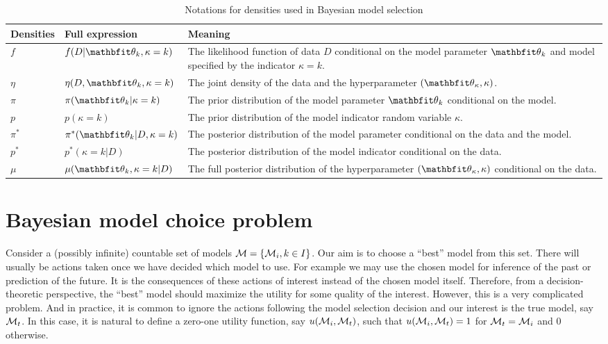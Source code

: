 \begin{table}[ht]
  \caption{Notations for densities used in Bayesian model selection}
  \label{tab:notations}
  \begin{tabularx}{\textwidth}{llX}
    \toprule
    Densities & Full expression & Meaning \\
    \midrule
    $f$ & $f(D|\bth_k,\kappa=k)$
    & The likelihood function of data $D$ conditional on the model parameter
    $\bth_k$ and model specified by the
    indicator $\kappa = k$. \\
    $\eta$ & $\eta(D,\bth_k,\kappa=k)$
    & The joint density of the data and the hyperparameter
    $(\bth_{\kappa},\kappa)$. \\
    $\pi$ & $\pi(\bth_k|\kappa=k)$
    & The prior distribution of the model parameter $\bth_k$ conditional on
    the model. \\
    $p$ & $p(\kappa = k)$
    & The prior distribution of the model indicator random variable
    $\kappa$. \\
    $\pi^*$ & $\pi^*(\bth_k|D,\kappa=k)$
    & The posterior distribution of the model parameter conditional on the
    data and the model. \\
    $p^*$ & $p^*(\kappa=k|D)$
    & The posterior distribution of the model indicator conditional on the
    data. \\
    $\mu$ & $\mu(\bth_k,\kappa=k|D)$
    & The full posterior distribution of the hyperparameter
    $(\bth_{\kappa},\kappa)$ conditional on the data. \\
    \bottomrule
  \end{tabularx}
\end{table}

\section{Bayesian model choice problem}
\label{sec:Bayesian model choice problem}

Consider a (possibly infinite) countable set of models $\mathcal{M} = \{\mathcal{M}_i,
  k\in I\}$. Our aim is to choose a ``best'' model from this set. There will
usually be actions taken once we have decided which model to use. For example
we may use the chosen model for inference of the past or prediction of the
future. It is the consequences of these actions of interest instead of the
chosen model itself. Therefore, from a decision-theoretic perspective, the
``best'' model should maximize the utility for some quality of the interest.
However, this is a very complicated problem. And in practice, it is common to
ignore the actions following the model selection decision and our interest is
the true model, say $\mathcal{M}_t$. In this case, it is natural to define a
zero-one utility function, say $u(\mathcal{M}_i,\mathcal{M}_t)$, such that
$u(\mathcal{M}_i,\mathcal{M}_t) = 1$ for $\mathcal{M}_t = \mathcal{M}_i$ and $0$ otherwise.

